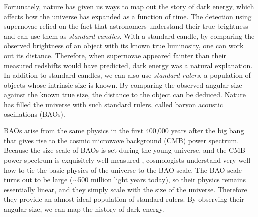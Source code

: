 \documentclass[11pt]{article}
\begin{document}
Fortunately, nature has given us ways to map out the story of dark
energy, which affects how the universe has expanded as a
function of time.  The detection using supernovae relied on
the fact that astronomers understand their true brightness and
can use them as {\textit{standard candles}}.  With a standard candle,
by comparing the observed brightness of an object with its known true
luminosity, one can work out its distance.  Therefore, when supernovae
appeared fainter than their measured redshifts would have predicted,
dark energy was a natural explanation.  In addition to standard
candles, we can also use {\textit{standard rulers}}, a population of
objects whose intrinsic size is known.  By comparing the observed
angular size against the known true size, the distance to the object can
be deduced.  Nature has filled the universe with such standard
rulers, called baryon acoustic oscillations (BAOs).  


BAOs arise from the same physics in the first 400,000 years after the
big bang that gives rise to the cosmic microwave background (CMB)
power spectrum.  Because the size scale of BAOs is set during the
young universe, and the CMB power spectrum is exquisitely well
measured \citep{PlanckSpectra2015,Louis2017,Henning2018}, cosmologists
understand very well how to tie the basic physics of the universe to
the BAO scale.  The BAO scale turns out to be large ($\sim$500 million
light years today), so their physics remains essentially linear, and
they simply scale with the size of the universe.  Therefore they
provide an almost ideal population of standard rulers. By observing
their angular size, we can map the history of dark energy.
\end{document}
